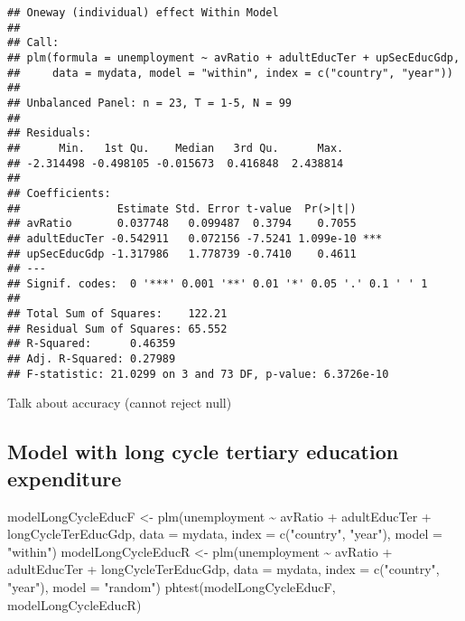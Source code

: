 \documentclass[
]{article}
\newenvironment{Shaded}{\begin{snugshade}}{\end{snugshade}}
\newcommand{\AttributeTok}[1]{\textcolor[rgb]{0.77,0.63,0.00}{#1}}
\newcommand{\FunctionTok}[1]{\textcolor[rgb]{0.00,0.00,0.00}{#1}}
\newcommand{\NormalTok}[1]{#1}
\newcommand{\OtherTok}[1]{\textcolor[rgb]{0.56,0.35,0.01}{#1}}
\newcommand{\SpecialCharTok}[1]{\textcolor[rgb]{0.00,0.00,0.00}{#1}}
\newcommand{\StringTok}[1]{\textcolor[rgb]{0.31,0.60,0.02}{#1}}
\begin{document}
\begin{verbatim}
## Oneway (individual) effect Within Model
## 
## Call:
## plm(formula = unemployment ~ avRatio + adultEducTer + upSecEducGdp, 
##     data = mydata, model = "within", index = c("country", "year"))
## 
## Unbalanced Panel: n = 23, T = 1-5, N = 99
## 
## Residuals:
##      Min.   1st Qu.    Median   3rd Qu.      Max. 
## -2.314498 -0.498105 -0.015673  0.416848  2.438814 
## 
## Coefficients:
##               Estimate Std. Error t-value  Pr(>|t|)    
## avRatio       0.037748   0.099487  0.3794    0.7055    
## adultEducTer -0.542911   0.072156 -7.5241 1.099e-10 ***
## upSecEducGdp -1.317986   1.778739 -0.7410    0.4611    
## ---
## Signif. codes:  0 '***' 0.001 '**' 0.01 '*' 0.05 '.' 0.1 ' ' 1
## 
## Total Sum of Squares:    122.21
## Residual Sum of Squares: 65.552
## R-Squared:      0.46359
## Adj. R-Squared: 0.27989
## F-statistic: 21.0299 on 3 and 73 DF, p-value: 6.3726e-10
\end{verbatim}

Talk about accuracy (cannot reject null)

\hypertarget{model-with-long-cycle-tertiary-education-expenditure}{%
\subsection{Model with long cycle tertiary education
expenditure}\label{model-with-long-cycle-tertiary-education-expenditure}}

\begin{Shaded}
\begin{Highlighting}[]
\NormalTok{modelLongCycleEducF }\OtherTok{\textless{}{-}} \FunctionTok{plm}\NormalTok{(unemployment }\SpecialCharTok{\textasciitilde{}}\NormalTok{  avRatio }\SpecialCharTok{+}\NormalTok{ adultEducTer }\SpecialCharTok{+}\NormalTok{ longCycleTerEducGdp,}
             \AttributeTok{data =}\NormalTok{ mydata, }\AttributeTok{index =} \FunctionTok{c}\NormalTok{(}\StringTok{"country"}\NormalTok{, }\StringTok{"year"}\NormalTok{), }\AttributeTok{model =} \StringTok{"within"}\NormalTok{)}
\NormalTok{modelLongCycleEducR }\OtherTok{\textless{}{-}} \FunctionTok{plm}\NormalTok{(unemployment }\SpecialCharTok{\textasciitilde{}}\NormalTok{  avRatio }\SpecialCharTok{+}\NormalTok{ adultEducTer }\SpecialCharTok{+}\NormalTok{ longCycleTerEducGdp,}
             \AttributeTok{data =}\NormalTok{ mydata, }\AttributeTok{index =} \FunctionTok{c}\NormalTok{(}\StringTok{"country"}\NormalTok{, }\StringTok{"year"}\NormalTok{), }\AttributeTok{model =} \StringTok{"random"}\NormalTok{)}
\FunctionTok{phtest}\NormalTok{(modelLongCycleEducF, modelLongCycleEducR)}
\end{Highlighting}
\end{Shaded}
\end{document}
